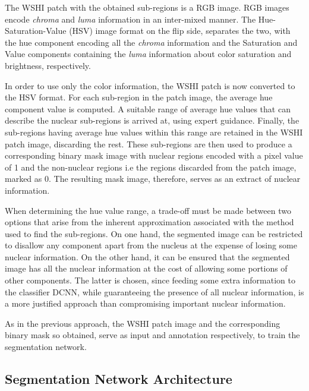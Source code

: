 \documentclass{comjnl}
\begin{document}
The WSHI patch with the obtained sub-regions is a RGB image. RGB images encode \emph{chroma} and \emph{luma} information in an inter-mixed manner. The Hue-Saturation-Value (HSV) image format on the flip side, separates the two, with the hue component encoding all the \emph{chroma} information and the Saturation and Value components containing the \emph{luma} information about color saturation and brightness, respectively. 

In order to use only the color information, the WSHI patch is now converted to the HSV format. For each sub-region in the patch image, the average hue component value is computed. A suitable range of average hue values that can describe the nuclear sub-regions is arrived at, using expert guidance. Finally, the sub-regions having average hue values within this range are retained in the WSHI patch image, discarding the rest. These sub-regions are then used to produce a corresponding binary mask image with nuclear regions encoded with a pixel value of 1 and the non-nuclear regions i.e the regions discarded from the patch image, marked as 0. The resulting mask image, therefore, serves as an extract of nuclear information.

When determining the hue value range, a trade-off must be made between two options that arise from the inherent approximation associated with the method used to find the sub-regions. On one hand, the segmented image can be restricted to disallow any component apart from the nucleus at the expense of losing some nuclear information. On the other hand, it can be ensured that the segmented image has all the nuclear information at the cost of allowing some portions of other components. The latter is chosen, since feeding some extra information to the classifier DCNN, while guaranteeing the presence of all nuclear information, is a more justified approach than compromising important nuclear information.

As in the previous approach, the WSHI patch image and the corresponding binary mask so obtained, serve as input and annotation respectively, to train the segmentation network. 

\subsection{Segmentation Network Architecture}
\end{document}
